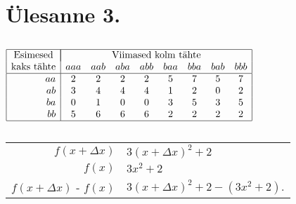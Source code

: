 \section{Ülesanne 3.}


\subsection*{}

\begin{center}
  $\begin{array}{ | r | *{8}{c} | }
    \hline
    \multicolumn{1}{|c|}{\text{Esimesed}} & \multicolumn{8}{|c|}{\text{Viimased kolm tähte}} \\
    \text{kaks tähte} & aaa & aab & aba & abb & baa & bba & bab & bbb \\ \hline
    aa & 2 & 2 & 2 & 2 & 5 & 7 & 5 & 7 \\
    ab & 3 & 4 & 4 & 4 & 1 & 2 & 0 & 2 \\
    ba & 0 & 1 & 0 & 0 & 3 & 5 & 3 & 5 \\
    bb & 5 & 6 & 6 & 6 & 2 & 2 & 2 & 2 \\
    \hline
  \end{array}$
\end{center}

\subsection*{}

\begin{center}
  \begin{tabular}{ r @{ $=$ } l }
					   $f(x+\Delta x)$ & $3(x + \Delta x)^2 + 2$ \\
					            $f(x)$ & $3x^2  + 2$ \\
    \hline
    $f(x+\Delta x)$ - $f(x)$ & $3(x + \Delta x)^2 + 2 - (3x^2  + 2)$.
  \end{tabular}
\end{center}
